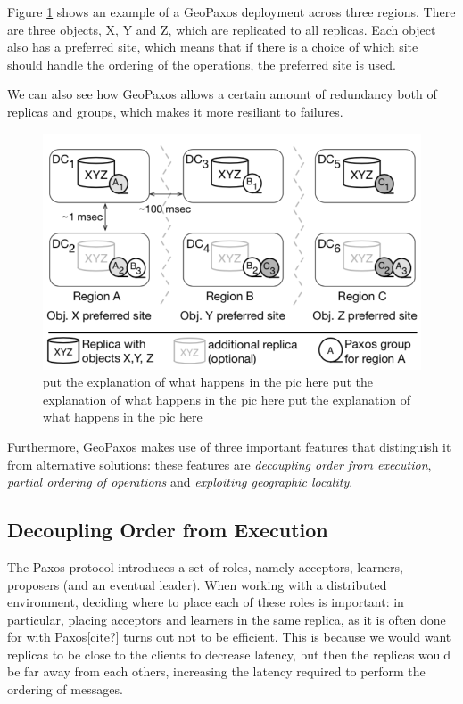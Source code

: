 Figure \ref{fig:datacenters} shows an example of a GeoPaxos deployment across three regions. There are three objects, X, Y and Z, which are replicated to all replicas. Each object also has a preferred site, which means that if there is a choice of which site should handle the ordering of the operations, the preferred site is used.

We can also see how GeoPaxos allows a certain amount of redundancy both of replicas and groups, which makes it more resiliant to failures.

\begin{figure}[htb]
  \centering
  \includegraphics[width=\textwidth,height=\textheight,keepaspectratio]{img/datacenters.png}

  \caption{put the explanation of what happens in the pic here put the explanation of what happens in the pic here put the explanation of what happens in the pic here} 
  \label{fig:datacenters}
\end{figure}

Furthermore, GeoPaxos makes use of three important features that distinguish it from alternative solutions: these features are \emph{decoupling order from execution}, \emph{partial ordering of operations} and \emph{exploiting geographic locality}. 

\subsection{Decoupling Order from Execution}
The Paxos protocol introduces a set of roles, namely acceptors, learners, proposers (and an eventual leader). When working with a distributed environment, deciding where to place each of these roles is important: in particular, placing acceptors and learners in the same replica, as it is often done for with Paxos[cite?] turns out not to be efficient. This is because we would want replicas to be close to the clients to decrease latency, but then the replicas would be far away from each others, increasing the latency required to perform the ordering of messages.

